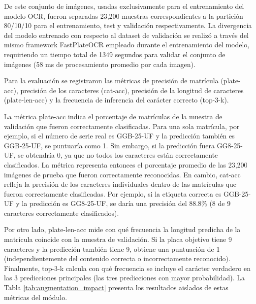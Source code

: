 De este conjunto de imágenes, usadas exclusivamente para el entrenamiento del modelo OCR, fueron separadas 23,200 muestras correspondientes a la partición 80/10/10 para el entrenamiento, test y validación respectivamente. La divergencia del modelo entrenado con respecto al dataset de validación se realizó a través del mismo framework FastPlateOCR empleado durante el entrenamiento del modelo, requiriendo un tiempo total de 1349 segundos para validar el conjunto de imágenes (58 ms de procesamiento promedio por cada imagen).

Para la evaluación se registraron las métricas de precisión de matrícula (plate-acc), precisión de los caracteres (cat-acc), precisión de la longitud de caracteres (plate-len-acc) y la frecuencia de inferencia del carácter correcto (top-3-k).

La métrica plate-acc indica el porcentaje de matrículas de la muestra de validación que fueron correctamente clasificadas. Para una sola matrícula, por ejemplo, si el número de serie real es GGB-25-UF y la predicción también es GGB-25-UF, se puntuaría como 1. Sin embargo, si la predicción fuera GG8-25-UF, se obtendría 0, ya que no todos los caracteres están correctamente clasificados. La métrica representa entonces el porcentaje promedio de las 23,200 imágenes de prueba que fueron correctamente reconocidas. En cambio, cat-acc refleja la precisión de los caracteres individuales dentro de las matrículas que fueron correctamente clasificadas. Por ejemplo, si la etiqueta correcta es GGB-25-UF y la predicción es GG8-25-UF, se daría una precisión del 88.8\% (8 de 9 caracteres correctamente clasificados).

Por otro lado, plate-len-acc mide con qué frecuencia la longitud predicha de la matrícula coincide con la muestra de validación. Si la placa objetivo tiene 9 caracteres y la predicción también tiene 9, obtiene una puntuación de 1 (independientemente del contenido correcta o incorrectamente reconocido). Finalmente, top-3-k calcula con qué frecuencia se incluye el carácter verdadero en las 3 predicciones principales (las tres predicciones con mayor probabilidad). La Tabla \ref{tab:augmentation_impact} presenta los resultados aislados de estas métricas del módulo.

